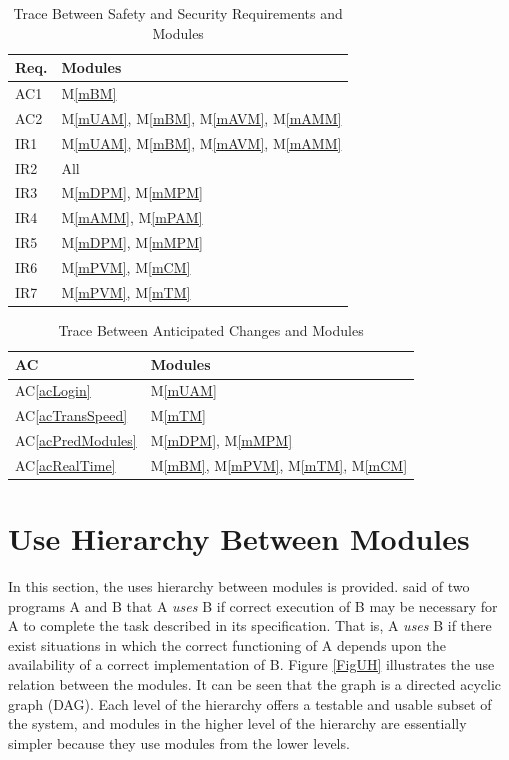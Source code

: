 \documentclass[12pt, titlepage]{article}
\newcommand{\acref}[1]{AC\ref{#1}}
\newcommand{\mref}[1]{M\ref{#1}}
\begin{document}
\begin{table}[H]
\centering
\begin{tabular}{p{} p{}}
\toprule
\textbf{Req.} & \textbf{Modules}\\
\midrule
AC1 & \mref{mBM}\\
AC2 & \mref{mUAM}, \mref{mBM}, \mref{mAVM}, \mref{mAMM}\\
IR1 & \mref{mUAM}, \mref{mBM}, \mref{mAVM}, \mref{mAMM}\\
IR2 & All \\
IR3 & \mref{mDPM}, \mref{mMPM}\\
IR4 & \mref{mAMM}, \mref{mPAM}\\
IR5 & \mref{mDPM}, \mref{mMPM}\\
IR6 & \mref{mPVM}, \mref{mCM}\\
IR7 & \mref{mPVM}, \mref{mTM}\\
\bottomrule
\end{tabular}
\caption{Trace Between Safety and Security Requirements and Modules}
\label{TblRT}
\end{table}

\begin{table}[H]
\centering
\begin{tabular}{p{} p{}}
\toprule
\textbf{AC} & \textbf{Modules}\\
\midrule
\acref{acLogin} & \mref{mUAM}\\
\acref{acTransSpeed} & \mref{mTM}\\
\acref{acPredModules} & \mref{mDPM}, \mref{mMPM}\\
\acref{acRealTime} & \mref{mBM}, \mref{mPVM}, \mref{mTM}, \mref{mCM}\\
\bottomrule
\end{tabular}
\caption{Trace Between Anticipated Changes and Modules}
\label{TblACT}
\end{table}

\section{Use Hierarchy Between Modules} \label{SecUse}

In this section, the uses hierarchy between modules is
provided. \citet{Parnas1978} said of two programs A and B that A {\em uses} B if
correct execution of B may be necessary for A to complete the task described in
its specification. That is, A {\em uses} B if there exist situations in which
the correct functioning of A depends upon the availability of a correct
implementation of B.  Figure \ref{FigUH} illustrates the use relation between
the modules. It can be seen that the graph is a directed acyclic graph
(DAG). Each level of the hierarchy offers a testable and usable subset of the
system, and modules in the higher level of the hierarchy are essentially simpler
because they use modules from the lower levels.
\end{document}
